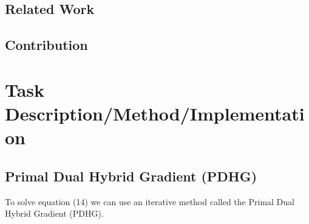 \documentclass[12pt]{article}
\begin{document}
\subsection{Related Work}


\subsection{Contribution}






    
    
    




\section{Task Description/Method/Implementation}



\subsection{Primal Dual Hybrid Gradient (PDHG)}

To solve equation
(14) 
we can use an iterative method called the Primal Dual Hybrid Gradient (PDHG). 
\end{document}

